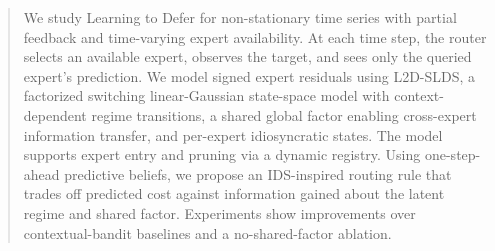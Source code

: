 \documentclass{article}
\begin{document}
\printAffiliationsAndNotice{}  %

\begin{abstract}
We study Learning to Defer for non-stationary time series with partial
feedback and time-varying expert availability. At each time step, the router selects an available expert,
observes the target, and sees only the queried expert's prediction. We model signed expert residuals
using L2D-SLDS, a factorized switching linear-Gaussian state-space model with
context-dependent regime transitions, a shared global factor enabling cross-expert information
transfer, and per-expert idiosyncratic states. The model supports expert entry and pruning via a
dynamic registry. Using one-step-ahead predictive beliefs, we propose an IDS-inspired routing rule
that trades off predicted cost against information gained about the latent regime and shared factor.
Experiments show improvements over contextual-bandit baselines and a no-shared-factor ablation.
\end{abstract}












\end{document}
